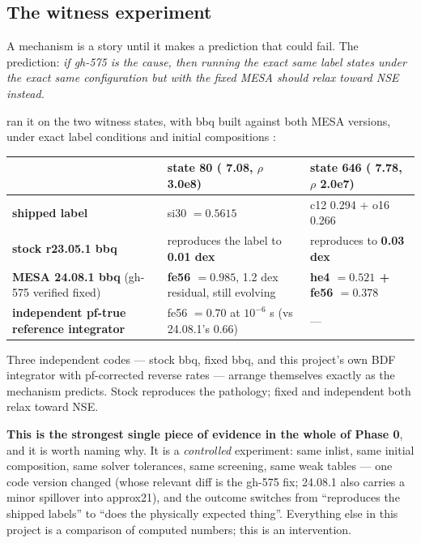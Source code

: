 \subsection{The witness experiment}
\label{sec:witness}

A mechanism is a story until it makes a prediction that could fail. The
prediction: \emph{if gh-575 is the cause, then running the exact same label
states under the exact same configuration but with the fixed MESA should relax
toward NSE instead.}

 ran it on the two witness states,
with bbq built against both MESA versions, under exact label conditions and
initial compositions :

\begingroup\small
\begin{tabularx}{\textwidth}{@{}L{4.6cm} Y Y@{}}
\toprule
 & \textbf{state 80 (\Tn{} 7.08, $\rho$ 3.0e8)} &
   \textbf{state 646 (\Tn{} 7.78, $\rho$ 2.0e7)} \\
\midrule
\textbf{shipped label} & si30 $= 0.5615$ & c12 0.294 + o16 0.266 \\
\textbf{stock r23.05.1 bbq} & reproduces the label to \textbf{0.01 dex} &
  reproduces to \textbf{0.03 dex} \\
\textbf{MESA 24.08.1 bbq} (gh-575 verified fixed) &
  \textbf{fe56 $= 0.985$}, 1.2 dex residual, \Ye{} still evolving &
  \textbf{he4 $= 0.521$ + fe56 $= 0.378$} \\
\textbf{independent pf-true reference integrator} &
  fe56 $= 0.70$ at $10^{-6}$ s (vs 24.08.1's 0.66) & --- \\
\bottomrule
\end{tabularx}
\endgroup

Three independent codes --- stock bbq, fixed bbq, and this project's own BDF
integrator with pf-corrected reverse rates --- arrange themselves exactly as
the mechanism predicts. Stock reproduces the pathology; fixed and independent
both relax toward NSE.

\textbf{This is the strongest single piece of evidence in the whole of Phase
0}, and it is worth naming why. It is a \emph{controlled} experiment: same
inlist, same initial composition, same solver tolerances, same screening, same
weak tables --- one code version changed (whose relevant diff is the gh-575
fix; 24.08.1 also carries a minor spillover into approx21), and the outcome
switches from ``reproduces the shipped labels'' to ``does the physically
expected thing''. Everything else in this project is a comparison of computed
numbers; this is an intervention.

